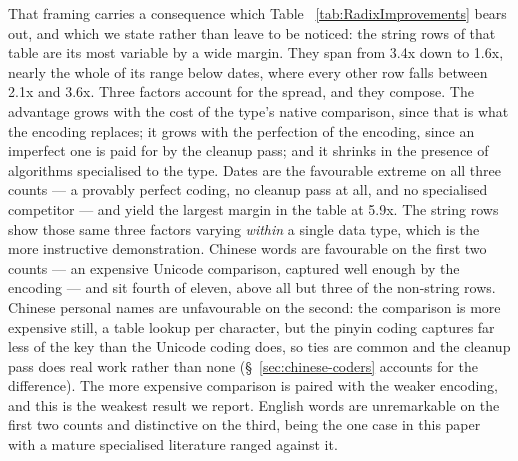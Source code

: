 \documentclass[twoside,leqno,twocolumn]{article}
\begin{document}
That framing carries a consequence which Table ~\ref{tab:RadixImprovements} bears out,
and which we state rather than leave to be noticed:
the string rows of that table are its most variable by a wide margin.
They span from 3.4x down to 1.6x, nearly the whole of its range below dates,
where every other row falls between 2.1x and 3.6x.
Three factors account for the spread, and they compose.
The advantage grows with the cost of the type's native comparison, since that is what the encoding replaces;
it grows with the perfection of the encoding, since an imperfect one is paid for by the cleanup pass;
and it shrinks in the presence of algorithms specialised to the type.
Dates are the favourable extreme on all three counts --- a provably perfect coding, no cleanup pass at all,
and no specialised competitor --- and yield the largest margin in the table at 5.9x.
The string rows show those same three factors varying \emph{within} a single data type,
which is the more instructive demonstration.
Chinese words are favourable on the first two counts --- an expensive Unicode comparison,
captured well enough by the encoding --- and sit fourth of eleven, above all but three of the non-string rows.
Chinese personal names are unfavourable on the second: the comparison is more expensive still,
a table lookup per character, but the pinyin coding captures far less of the key than the Unicode
coding does, so ties are common and the cleanup pass does real work rather than none
(\S~\ref{sec:chinese-coders} accounts for the difference).
The more expensive comparison is paired with the weaker encoding, and this is the weakest result we report.
English words are unremarkable on the first two counts and distinctive on the third,
being the one case in this paper with a mature specialised literature ranged against it.
\end{document}
